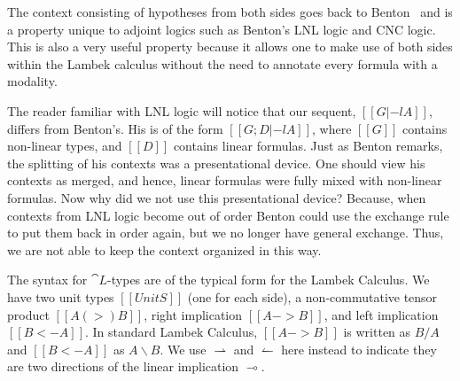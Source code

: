The context consisting of hypotheses from both sides goes back to
Benton~\cite{Benton:1994} and is a property unique to adjoint logics such as
Benton's LNL logic and CNC logic. This is also a very useful property
because it allows one to make use of both sides within the Lambek calculus
without the need to annotate every formula with a modality.

The reader familiar with LNL logic will notice that our sequent,
$[[G |-l A]]$, differs from Benton's. His is of the form $[[G; D |-l A]]$,
where $[[G]]$ contains non-linear types, and $[[D]]$ contains linear
formulas. Just as Benton remarks, the splitting of his contexts was a
presentational device. One should view his contexts as merged, and hence,
linear formulas were fully mixed with non-linear formulas. Now why did we
not use this presentational device? Because, when contexts from LNL logic
become out of order Benton could use the exchange rule to put them back in
order again, but we no longer have general exchange. Thus, we are not able
to keep the context organized in this way.

The syntax for $\cat{L}$-types are of the typical form for the Lambek
Calculus. We have two unit types $[[UnitS]]$ (one for each side), a
non-commutative tensor product $[[A (>) B]]$, right implication
$[[A -> B]]$, and left implication $[[B <- A]]$. In standard Lambek
Calculus, $[[A -> B]]$ is written as $B / A$ and $[[B <- A]]$ as
$A \backslash B$. We use $\rightharpoonup$ and $\leftharpoonup$ here
instead to indicate they are two directions of the linear implication
$\multimap$.

